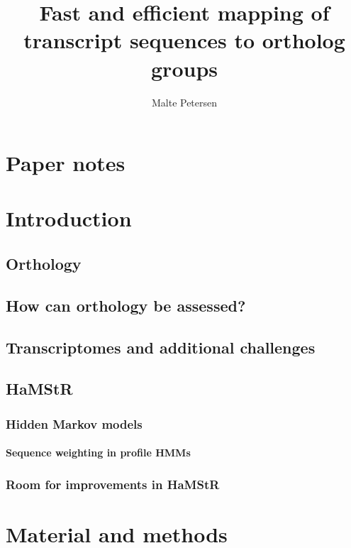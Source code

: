 \documentclass[a4paper,12pt]{scrreprt}
\title{Fast and efficient mapping of transcript sequences to ortholog groups}
\author{Malte Petersen}
\newcommand{\hamstr}{HaMStR\xspace}
\begin{document}
\maketitle
\pagestyle{headings}
\tableofcontents

\chapter*{Paper notes}
	



\chapter{Introduction}
	
	\section{Orthology}
		
	\section{How can orthology be assessed?}
		
	\section{Transcriptomes and additional challenges}
		
	\section{\hamstr}
		
		\subsection{Hidden Markov models}
			
			\subsubsection{Sequence weighting in profile HMMs}
				
		\subsection{Room for improvements in \hamstr}
			

\chapter{Material and methods}
\end{document}
